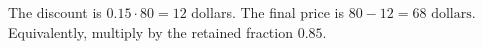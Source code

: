 The discount is $0.15\cdot80=12$ dollars. The final price is $80-12=\boxed{68\text{ dollars}}$. Equivalently, multiply by the retained fraction $0.85$.
